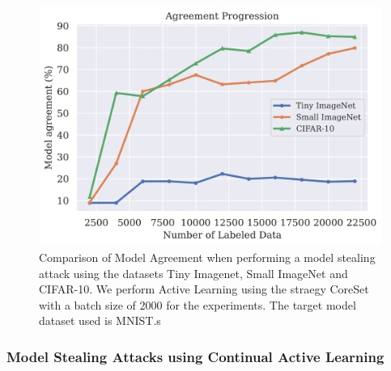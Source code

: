 \begin{figure}[h]
    \centering
    \includegraphics[width=0.8\linewidth]{images/results_CALMS/effect_dataset.png}
    \caption[Effect of Thief Dataset choice on the success of Model Stealing Attacks]{Comparison of Model Agreement when performing a model stealing attack using the datasets Tiny Imagenet, Small ImageNet and CIFAR-10. We perform Active Learning using the 
    straegy CoreSet with a batch size of 2000 for the experiments. The target model dataset used is MNIST.s}
    \label{fig:Evaluation:Results:CAL:EffectDataset}
\end{figure}


\subsubsection{Model Stealing Attacks using Continual Active Learning}
\label{sec:Evaluation:Results:MS:CAL}


